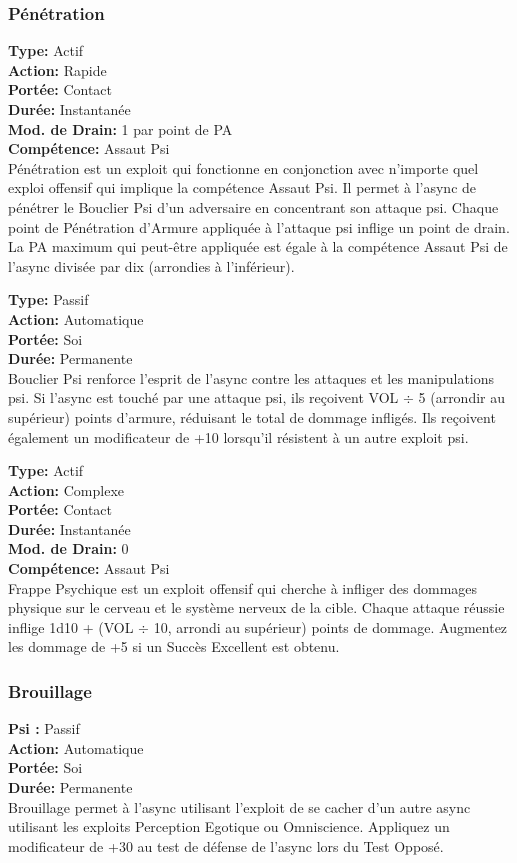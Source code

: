 \subsubsection{Pénétration} \textbf{Type:} Actif \\ \textbf{Action:} Rapide \\ \textbf{Portée:} Contact \\ \textbf{Durée:} Instantanée \\ \textbf{Mod. de Drain:} 1 par point de PA \\ \textbf{Compétence:} Assaut Psi \\ Pénétration est un exploit qui fonctionne en conjonction avec n'importe quel exploi offensif qui implique la compétence Assaut Psi. Il permet à l'async de pénétrer le Bouclier Psi d'un adversaire en concentrant son attaque psi. Chaque point de Pénétration d'Armure appliquée à l'attaque psi inflige un point de drain. La PA maximum qui peut-être appliquée est égale à la compétence Assaut Psi de l'async divisée par dix (arrondies à l'inférieur). 

 \textbf{Type:} Passif \\ \textbf{Action:} Automatique \\ \textbf{Portée:} Soi \\ \textbf{Durée:} Permanente \\ Bouclier Psi renforce l'esprit de l'async contre les attaques et les manipulations psi. Si l'async est touché par une attaque psi, ils reçoivent VOL $\div$ 5 (arrondir au supérieur) points d'armure, réduisant le total de dommage infligés. Ils reçoivent également un modificateur de +10 lorsqu'il résistent à un autre exploit psi. 

 \textbf{Type:} Actif \\ \textbf{Action:} Complexe \\ \textbf{Portée:} Contact \\ \textbf{Durée:} Instantanée \\ \textbf{Mod. de Drain:} 0 \\ \textbf{Compétence:} Assaut Psi \\ Frappe Psychique est un exploit offensif qui cherche à infliger des dommages physique sur le cerveau et le système nerveux de la cible. Chaque attaque réussie inflige 1d10 + (VOL $\div$ 10, arrondi au supérieur) points de dommage. Augmentez les dommage de +5 si un Succès Excellent est obtenu. 

\subsubsection{Brouillage} \textbf{Psi :} Passif \\ \textbf{Action:} Automatique \\ \textbf{Portée:} Soi \\ \textbf{Durée:} Permanente \\ Brouillage permet à l'async utilisant l'exploit de se cacher d'un autre async utilisant les exploits Perception Egotique ou Omniscience. Appliquez un modificateur de +30 au test de défense de l'async lors du Test Opposé. 

